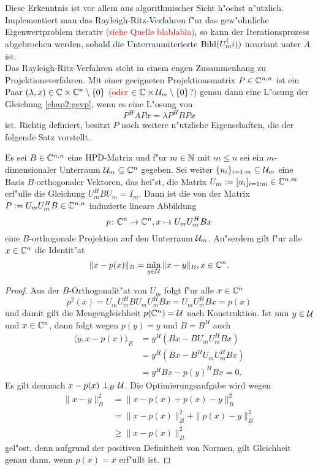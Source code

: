 Diese Erkenntnis ist vor allem aus algorithmischer Sicht h"ochst n"utzlich. Implementiert
man das Rayleigh-Ritz-Verfahren f"ur das gew"ohnliche Eigenwertproblem iterativ \textcolor{red}{(siehe Quelle blablabla)}, so
kann der Iterationsprozess abgebrochen werden, sobald die Unterraumiterierte $\operatorname{Bild}(U_m^(i))$
invariant unter $A$ ist.\\

Das Rayleigh-Ritz-Verfahren steht in einem engen Zusammenhang zu Projektionsverfahren.
Mit einer geeigneten Projektionsmatrix $P\in\mathbb{C}^{n,n}$ ist ein Paar $(\lambda, x)\in\mathbb{C}\times\mathbb{C}^n \setminus\{0\}$
\textcolor{red}{(oder $\in\mathbb{C}\times\mathcal{U}_m\setminus\{0\}$?)} genau dann eine L"osung
der Gleichung \eqref{chap2:gevp}, wenn es eine L"osung von
\[
P^H APx = \lambda P^H BPx
\]
ist. Richtig definiert, besitzt $P$ noch weitere n"utzliche Eigenschaften, die
der folgende Satz vorstellt.

\begin{thm}\label{thm:projektor}
Es sei $B\in\mathbb{C}^{n,n}$ eine HPD-Matrix und f"ur $m\in\mathbb{N}$ mit $m\le n$ sei
ein $m$-dimensionaler Unterraum $\mathcal{U}_m \subseteq \mathbb{C}^n$ gegeben. Sei weiter $\{u_i\}_{i=1:m}\subseteq\mathcal{U}_m$ eine
Basis $B$-orthogonaler Vektoren, das hei"st, die Matrix $U_m := [u_i]_{i=1:m}
\in\mathbb{C}^{n,m}$ erf"ulle die Gleichung $U_m^H B U_m = I_m$. Dann ist die von der Matrix
 $P := U_m U_m^H B \in \mathbb{C}^{n,n}$ induzierte lineare Abbildung
\[
p \colon \mathbb{C}^n \to \mathbb{C}^n, x\mapsto U_m U_m^H Bx
\]
eine $B$-orthogonale Projektion auf den Unterraum $\mathcal{U}_m$. Au"serdem gilt
f"ur alle $x\in\mathbb{C}^n$ die Identit"at
\[
\|x-p(x)\|_B = \min_{y\in\mathcal{U}} \|x - y\|_B, x\in\mathbb{C}^n.
\]
\end{thm}

\begin{proof}
Aus der $B$-Orthogonalit"at von $U_m$ folgt f"ur alle $x\in\mathbb{C}^n$
\[
p^2 (x) = U_m U_m^H B U_m U_m^H B x= U_m U_m^H Bx = p(x)
\]
und damit gilt die Mengengleichheit $p(\mathbb{C}^n) = \mathcal{U}$ nach Konstruktion. %
Ist nun $y\in\mathcal{U}$ und $x\in\mathbb{C}^n$, dann folgt wegen $p(y) = y$ und $B=B^H$ auch
\begin{align*}
\langle y, x-p(x)\rangle_B &= y^H (Bx - B U_m U_m^H Bx) \\
&= y^H (Bx - B^H U_m U_m^H Bx) \\
&= y^H Bx - p(y)^H Bx = 0.
\end{align*}
Es gilt demnach $x-p(x) \ \bot_B \ \mathcal{U}$. Die Optimierungsaufgabe wird wegen
\begin{align*}
\|x-y\|_B^2 &= \|x-p(x) + p(x)-y\|_B^2 \\
&= \|x-p(x)\|_B^2 + \|p(x)-y\|_B^2\\
&\ge \|x-p(x)\|_B^2
\end{align*}
gel"ost, denn aufgrund der positiven Definitheit von Normen, gilt Gleichheit genau dann,
wenn $p(x)=x$ erf"ullt ist.
\end{proof}

